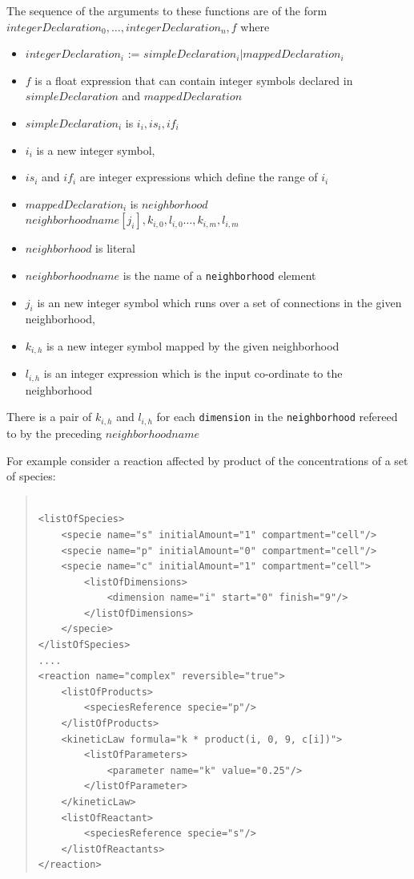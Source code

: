 \documentclass[10pt]{article}
\newcommand{\tightspacing}{\renewcommand{\baselinestretch}{0.85}}
\newcommand{\regularspacing}{\renewcommand{\baselinestretch}{1.0}}
\newcommand{\class}[1]{\texttt{#1}}
\begin{document}
The sequence of the arguments to these functions are of the form
$ integerDeclaration_{0}, \ldots, integerDeclaration_{n}, f$ where
\begin{itemize}
\item $ integerDeclaration_{i} $ := $ simpleDeclaration_{i} | mappedDeclaration_{i} $
\item $f$ is a float expression that can contain integer symbols declared in $simpleDeclaration$ and $mappedDeclaration$
\item $ simpleDeclaration_{i} $ is $i_{i}, is_{i}, if_{i}$
\item $i_{i}$ is a new integer symbol,
\item $is_{i}$ and $if_{i}$ are integer expressions which define the
range of $i_{i}$
\item $ mappedDeclaration_{i} $ is $ neighborhood $ $ neighborhoodname [j_{i}], k_{i,0}, l_{i,0}
\ldots, k_{i,m}, l_{i,m} $
\item $neighborhood$ is literal
\item $neighborhoodname$ is the name of a \class{neighborhood} element
\item $j_{i}$ is an new integer symbol which runs over a set of connections in the given neighborhood,
\item $k_{i,h}$ is a new integer symbol mapped by the given neighborhood
\item $l_{i,h}$ is an integer expression which is the input co-ordinate to the neighborhood
\end{itemize}
There is a pair of $k_{i,h}$ and $l_{i,h}$ for each
\class{dimension} in the \class{neighborhood} refereed to by the
preceding $neighborhoodname$

For example consider a reaction affected by product of the concentrations of a set of species:

\begin{quote}
  \begin{small}
    \tightspacing
\begin{verbatim}

<listOfSpecies>
    <specie name="s" initialAmount="1" compartment="cell"/>
    <specie name="p" initialAmount="0" compartment="cell"/>
    <specie name="c" initialAmount="1" compartment="cell">
        <listOfDimensions>
            <dimension name="i" start="0" finish="9"/>
        </listOfDimensions>
    </specie>
</listOfSpecies>
....
<reaction name="complex" reversible="true">
    <listOfProducts>
        <speciesReference specie="p"/>
    </listOfProducts>
    <kineticLaw formula="k * product(i, 0, 9, c[i])">
        <listOfParameters>
            <parameter name="k" value="0.25"/>
        </listOfParameter>
    </kineticLaw>
    <listOfReactant>
        <speciesReference specie="s"/>
    </listOfReactants>
</reaction>

\end{verbatim}
    \regularspacing
  \end{small}
\end{quote}
\end{document}
